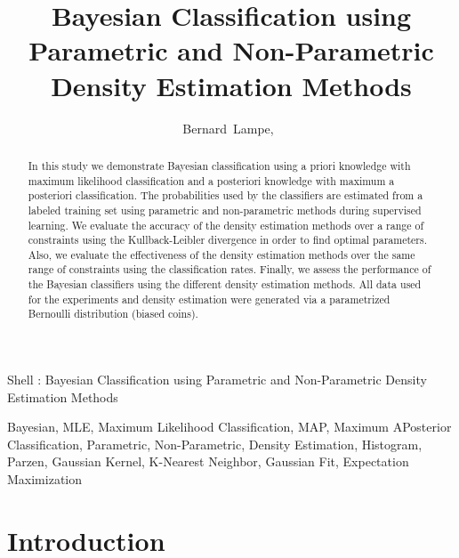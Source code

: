 \documentclass[journal]{IEEEtran}
\begin{document}
\title{Bayesian Classification using Parametric and Non-Parametric Density Estimation Methods}

\author{Bernard~Lampe,~}

{Shell \MakeLowercase{\Lampe}: Bayesian Classification using Parametric and Non-Parametric Density Estimation Methods}

\maketitle

\begin{abstract}
In this study we demonstrate Bayesian classification using a priori knowledge with maximum likelihood classification and a posteriori knowledge with maximum a posteriori classification. The probabilities used by the classifiers are estimated from a labeled training set using parametric and non-parametric methods during supervised learning. We evaluate the accuracy of the density estimation methods over a range of constraints using the Kullback-Leibler divergence in order to find optimal parameters. Also, we evaluate the effectiveness of the density estimation methods over the same range of constraints using the classification rates. Finally, we assess the performance of the Bayesian classifiers using the different density estimation methods. All data used for the experiments and density estimation were generated via a parametrized Bernoulli distribution (biased coins).
\end{abstract}

\begin{IEEEkeywords}
Bayesian, MLE, Maximum Likelihood Classification, MAP, Maximum APosterior Classification, Parametric, Non-Parametric, Density Estimation, Histogram, Parzen, Gaussian Kernel, K-Nearest Neighbor, Gaussian Fit, Expectation Maximization
\end{IEEEkeywords}

\section{Introduction}
\end{document}
